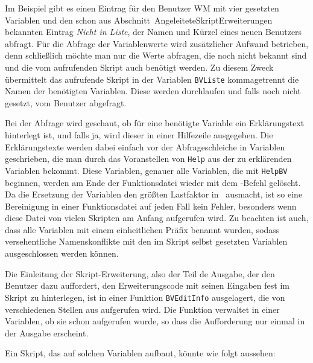 Im Beispiel gibt es einen Eintrag für den Benutzer WM mit vier gesetzten Variablen und den schon aus Abschnitt~{AngeleiteteSkriptErweiterungen} bekannten Eintrag \emph{Nicht in Liste}, der Namen und Kürzel eines neuen Benutzers abfragt. Für die Abfrage der Variablenwerte wird zusätzlicher Aufwand betrieben, denn schließlich möchte man nur die Werte abfragen, die noch nicht bekannt sind und die vom aufrufenden Skript auch benötigt werden. Zu diesem Zweck übermittelt das aufrufende Skript in der Variablen \verb|BVListe| kommagetrennt die Namen der benötigten Variablen. Diese werden durchlaufen und falls noch nicht gesetzt, vom Benutzer abgefragt.

Bei der Abfrage wird geschaut, ob für eine benötigte Variable ein Erklärungstext hinterlegt ist, und falls ja, wird dieser in einer Hilfezeile ausgegeben. Die Erklärungstexte werden dabei einfach vor der Abfrageschleiche in Variablen geschrieben, die man durch das Voranstellen von \verb|Help| aus der zu erklärenden Variablen bekommt. Diese Variablen, genauer alle Variablen, die mit \verb|HelpBV| beginnen, werden am Ende der Funktionsdatei wieder mit dem -Befehl gelöscht. Da die Ersetzung der Variablen den größten Lastfaktor in \FPZ\ ausmacht, ist so eine Bereinigung in einer Funktionsdatei auf jeden Fall kein Fehler, besonders wenn diese Datei von vielen Skripten am Anfang aufgerufen wird. Zu beachten ist auch, dass alle Variablen mit einem einheitlichen Präfix benannt wurden, sodass versehentliche Namenskonflikte mit den im Skript selbst gesetzten Variablen ausgeschlossen werden können.

Die Einleitung der Skript-Erweiterung, also der Teil de Ausgabe, der den Benutzer dazu auffordert, den Erweiterungscode mit seinen Eingaben fest im Skript zu hinterlegen, ist in einer Funktion \verb|BVEditInfo| ausgelagert, die von verschiedenen Stellen aus aufgerufen wird. Die Funktion verwaltet in einer Variablen, ob sie schon aufgerufen wurde, so dass die Auf\-for\-derung nur einmal in der Ausgabe erscheint.

Ein Skript, das auf solchen Variablen aufbaut, könnte wie folgt aussehen:

